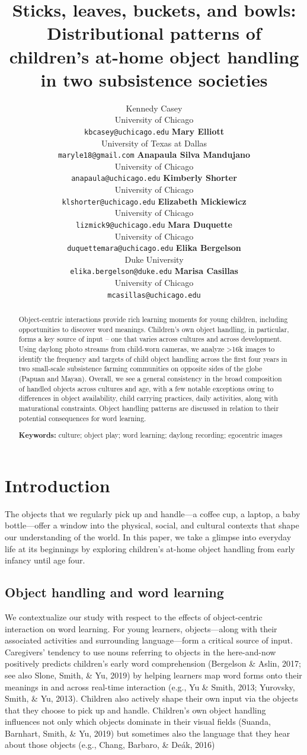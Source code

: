 \documentclass[10pt, letterpaper]{article}
\title{Sticks, leaves, buckets, and bowls: Distributional patterns of
children's at-home object handling in two subsistence societies}
\author{Kennedy Casey \\
        University of Chicago \\
        \texttt{\small{kbcasey@uchicago.edu}}
\And \textbf{Mary Elliott} \\
             University of Texas at Dallas \\
             \texttt{\small{maryle18@gmail.com}}
\And \textbf{Anapaula Silva Mandujano} \\
             University of Chicago \\
             \texttt{\small{anapaula@uchicago.edu}}   
\And \textbf{Kimberly Shorter} \\
             University of Chicago \\
             \texttt{\small{klshorter@uchicago.edu}}
\AND \textbf{Elizabeth Mickiewicz} \\
             University of Chicago \\
             \texttt{\small{lizmick9@uchicago.edu}}         
\And \textbf{Mara Duquette} \\
             University of Chicago \\
             \texttt{\small{duquettemara@uchicago.edu}}
\And \textbf{Elika Bergelson} \\
             Duke University \\
             \texttt{\small{elika.bergelson@duke.edu}}
\And \textbf{Marisa Casillas} \\
             University of Chicago \\
             \texttt{\small{mcasillas@uchicago.edu}}}
\begin{document}
\maketitle

\begin{abstract}
Object-centric interactions provide rich learning moments for young
children, including opportunities to discover word meanings. Children's
own object handling, in particular, forms a key source of input -- one
that varies across cultures and across development. Using daylong photo
streams from child-worn cameras, we analyze \textgreater16k images to
identify the frequency and targets of child object handling across the
first four years in two small-scale subsistence farming communities on
opposite sides of the globe (Papuan and Mayan). Overall, we see a
general consistency in the broad composition of handled objects across
cultures and age, with a few notable exceptions owing to differences in
object availability, child carrying practices, daily activities, along
with maturational constraints. Object handling patterns are discussed in
relation to their potential consequences for word learning.

\textbf{Keywords:}
culture; object play; word learning; daylong recording; egocentric
images
\end{abstract}

\hypertarget{introduction}{%
\section{Introduction}\label{introduction}}

The objects that we regularly pick up and handle---a coffee cup, a
laptop, a baby bottle---offer a window into the physical, social, and
cultural contexts that shape our understanding of the world. In this
paper, we take a glimpse into everyday life at its beginnings by
exploring children's at-home object handling from early infancy until
age four.

\hypertarget{object-handling-and-word-learning}{%
\subsection{Object handling and word
learning}\label{object-handling-and-word-learning}}

We contextualize our study with respect to the effects of object-centric
interaction on word learning. For young learners, objects---along with
their associated activities and surrounding language---form a critical
source of input. Caregivers' tendency to use nouns referring to objects
in the here-and-now positively predicts children's early word
comprehension (Bergelson \& Aslin, 2017; see also Slone, Smith, \& Yu,
2019) by helping learners map word forms onto their meanings in and
across real-time interaction (e.g., Yu \& Smith, 2013; Yurovsky, Smith,
\& Yu, 2013). Children also actively shape their own input via the
objects that they choose to pick up and handle. Children's own object
handling influences not only which objects dominate in their visual
fields (Suanda, Barnhart, Smith, \& Yu, 2019) but sometimes also the
language that they hear about those objects (e.g., Chang, Barbaro, \&
Deák, 2016)
\end{document}
